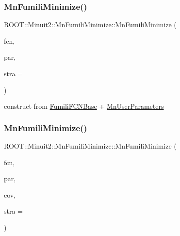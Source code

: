 \subsubsection{\texorpdfstring{MnFumiliMinimize()}{MnFumiliMinimize()}\hspace{0.1cm}{\footnotesize\ttfamily [4/14]}}
{\footnotesize\ttfamily R\+O\+O\+T\+::\+Minuit2\+::\+Mn\+Fumili\+Minimize\+::\+Mn\+Fumili\+Minimize (\begin{DoxyParamCaption}\item[{const \mbox{\hyperlink{classROOT_1_1Minuit2_1_1FumiliFCNBase}{Fumili\+F\+C\+N\+Base}} \&}]{fcn,  }\item[{const \mbox{\hyperlink{classROOT_1_1Minuit2_1_1MnUserParameters}{Mn\+User\+Parameters}} \&}]{par,  }\item[{unsigned int}]{stra = {} }\end{DoxyParamCaption})\hspace{0.3cm}{\ttfamily [inline]}}



construct from \mbox{\hyperlink{classROOT_1_1Minuit2_1_1FumiliFCNBase}{Fumili\+F\+C\+N\+Base}} + \mbox{\hyperlink{classROOT_1_1Minuit2_1_1MnUserParameters}{Mn\+User\+Parameters}} 

\mbox{\label{classROOT_1_1Minuit2_1_1MnFumiliMinimize_a3dd4f225ca0cdfdc6eb542ee32667984}} 
\subsubsection{\texorpdfstring{MnFumiliMinimize()}{MnFumiliMinimize()}\hspace{0.1cm}{\footnotesize\ttfamily [5/14]}}
{\footnotesize\ttfamily R\+O\+O\+T\+::\+Minuit2\+::\+Mn\+Fumili\+Minimize\+::\+Mn\+Fumili\+Minimize (\begin{DoxyParamCaption}\item[{const \mbox{\hyperlink{classROOT_1_1Minuit2_1_1FumiliFCNBase}{Fumili\+F\+C\+N\+Base}} \&}]{fcn,  }\item[{const \mbox{\hyperlink{classROOT_1_1Minuit2_1_1MnUserParameters}{Mn\+User\+Parameters}} \&}]{par,  }\item[{const \mbox{\hyperlink{classROOT_1_1Minuit2_1_1MnUserCovariance}{Mn\+User\+Covariance}} \&}]{cov,  }\item[{unsigned int}]{stra = {} }\end{DoxyParamCaption})\hspace{0.3cm}{\ttfamily [inline]}}



